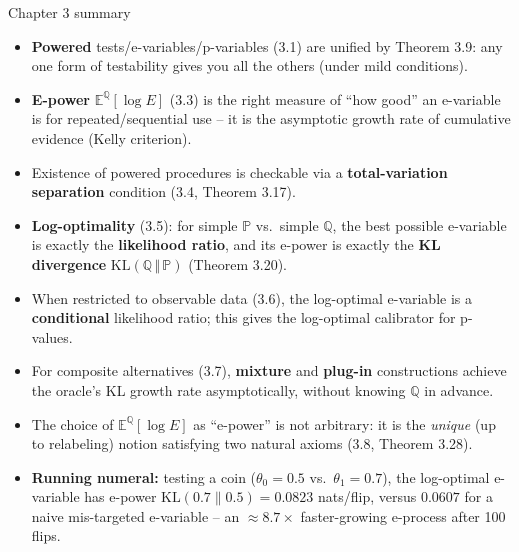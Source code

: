 \documentclass[aspectratio=169,10pt]{beamer}
\newcommand{\PP}{\mathbb{P}}
\newcommand{\QQ}{\mathbb{Q}}
\newcommand{\EE}{\mathbb{E}}
\newcommand{\KL}[2]{\mathrm{KL}(#1 \,\Vert\, #2)}
\begin{document}
\begin{frame}{Chapter 3 summary}
  \begin{itemize}
    \item \textbf{Powered} tests/e-variables/p-variables (3.1) are unified by Theorem 3.9: any one form of testability gives you all the others (under mild conditions).
    \item \textbf{E-power} $\EE^\QQ[\log E]$ (3.3) is the right measure of ``how good'' an e-variable is for repeated/sequential use -- it is the asymptotic growth rate of cumulative evidence (Kelly criterion).
    \item Existence of powered procedures is checkable via a \textbf{total-variation separation} condition (3.4, Theorem 3.17).
    \item \textbf{Log-optimality} (3.5): for simple $\PP$ vs.\ simple $\QQ$, the best possible e-variable is exactly the \textbf{likelihood ratio}, and its e-power is exactly the \textbf{KL divergence} $\KL{\QQ}{\PP}$ (Theorem 3.20).
    \item When restricted to observable data (3.6), the log-optimal e-variable is a \textbf{conditional} likelihood ratio; this gives the log-optimal calibrator for p-values.
    \item For composite alternatives (3.7), \textbf{mixture} and \textbf{plug-in} constructions achieve the oracle's KL growth rate asymptotically, without knowing $\QQ$ in advance.
    \item The choice of $\EE^\QQ[\log E]$ as ``e-power'' is not arbitrary: it is the \emph{unique} (up to relabeling) notion satisfying two natural axioms (3.8, Theorem 3.28).
    \item \textbf{Running numeral:} testing a coin ($\theta_0=0.5$ vs.\ $\theta_1=0.7$), the log-optimal e-variable has e-power $\mathrm{KL}(0.7\|0.5)=0.0823$ nats/flip, versus $0.0607$ for a naive mis-targeted e-variable -- an $\approx 8.7\times$ faster-growing e-process after 100 flips.
  \end{itemize}
\end{frame}
\end{document}
